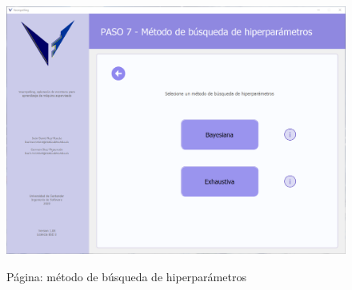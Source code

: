 \begin{figure}[H]
    \centering
    \caption{Página: método de búsqueda de hiperparámetros}
    \includegraphics[width=\textwidth]{views/hiperparameter_search_method.png}
    \label{fig:hiperparamsearchmethod}
\end{figure}


